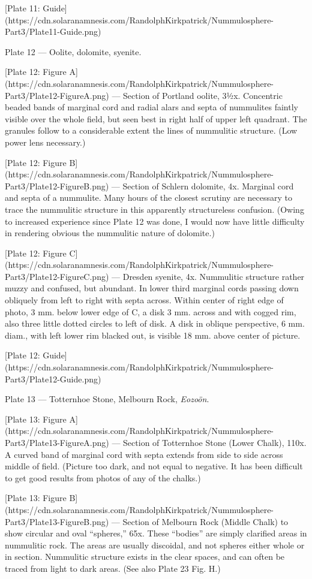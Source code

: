 \documentclass[a4paper, 12pt, oneside]{article}
\begin{document}
[Plate 11: Guide](https://cdn.solaranamnesis.com/RandolphKirkpatrick/Nummulosphere-Part3/Plate11-Guide.png)

Plate 12 --- Oolite, dolomite, syenite.

[Plate 12: Figure A](https://cdn.solaranamnesis.com/RandolphKirkpatrick/Nummulosphere-Part3/Plate12-FigureA.png) --- Section of Portland oolite, 3½x. Concentric beaded bands of marginal cord and radial alars and septa of nummulites faintly visible over the whole field, but seen best in right half of upper left quadrant. The granules follow to a considerable extent the lines of nummulitic structure. (Low power lens necessary.)

[Plate 12: Figure B](https://cdn.solaranamnesis.com/RandolphKirkpatrick/Nummulosphere-Part3/Plate12-FigureB.png) --- Section of Schlern dolomite, 4x. Marginal cord and septa of a nummulite. Many hours of the closest scrutiny are necessary to trace the nummulitic structure in this apparently structureless confusion. (Owing to increased experience since Plate 12 was done, I would now have little difficulty in rendering obvious the nummulitic nature of dolomite.)

[Plate 12: Figure C](https://cdn.solaranamnesis.com/RandolphKirkpatrick/Nummulosphere-Part3/Plate12-FigureC.png) --- Dresden syenite, 4x. Nummulitic structure rather muzzy and confused, but abundant. In lower third marginal cords passing down obliquely from left to right with septa across. Within center of right edge of photo, 3 mm. below lower edge of C, a disk 3 mm. across and with cogged rim, also three little dotted circles to left of disk. A disk in oblique perspective, 6 mm. diam., with left lower rim blacked out, is visible 18 mm. above center of picture.

[Plate 12: Guide](https://cdn.solaranamnesis.com/RandolphKirkpatrick/Nummulosphere-Part3/Plate12-Guide.png)

Plate 13 --- Totternhoe Stone, Melbourn Rock, \emph{Eozoön}.

[Plate 13: Figure A](https://cdn.solaranamnesis.com/RandolphKirkpatrick/Nummulosphere-Part3/Plate13-FigureA.png) --- Section of Totternhoe Stone (Lower Chalk), 110x. A curved band of marginal cord with septa extends from side to side across middle of field. (Picture too dark, and not equal to negative. It has been difficult to get good results from photos of any of the chalks.)

[Plate 13: Figure B](https://cdn.solaranamnesis.com/RandolphKirkpatrick/Nummulosphere-Part3/Plate13-FigureB.png) --- Section of Melbourn Rock (Middle Chalk) to show circular and oval ``spheres,'' 65x. These ``bodies'' are simply clarified areas in nummulitic rock. The areas are usually discoidal, and not spheres either whole or in section. Nummulitic structure exists in the clear spaces, and can often be traced from light to dark areas. (See also Plate 23 Fig. H.)
\end{document}

